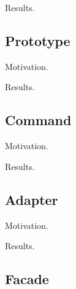   Results. 

  \begin{example}
    
  \end{example}

\subsection{Prototype} 

  Motivation. 

  \begin{definition}[]
    
  \end{definition}

  Results. 

  \begin{example}
    
  \end{example}

\subsection{Command} 

  Motivation. 

  \begin{definition}[]
    
  \end{definition}

  Results. 

  \begin{example}
    
  \end{example}

\subsection{Adapter}

  Motivation. 

  \begin{definition}[]
    
  \end{definition}

  Results. 

  \begin{example}
    
  \end{example}

\subsection{Facade}

